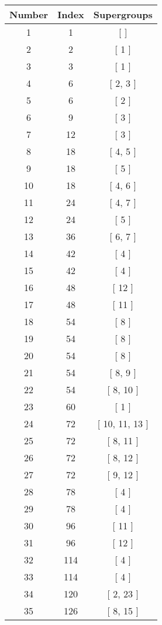\begin{center}
\begin{longtable}[H]{|| c c c ||}
\hline
Number & Index & Supergroups \\ 
\hline
1 & 1 & [  ] \\ 
\hline
2 & 2 & [ 1 ] \\ 
\hline
3 & 3 & [ 1 ] \\ 
\hline
4 & 6 & [ 2, 3 ] \\ 
\hline
5 & 6 & [ 2 ] \\ 
\hline
6 & 9 & [ 3 ] \\ 
\hline
7 & 12 & [ 3 ] \\ 
\hline
8 & 18 & [ 4, 5 ] \\ 
\hline
9 & 18 & [ 5 ] \\ 
\hline
10 & 18 & [ 4, 6 ] \\ 
\hline
11 & 24 & [ 4, 7 ] \\ 
\hline
12 & 24 & [ 5 ] \\ 
\hline
13 & 36 & [ 6, 7 ] \\ 
\hline
14 & 42 & [ 4 ] \\ 
\hline
15 & 42 & [ 4 ] \\ 
\hline
16 & 48 & [ 12 ] \\ 
\hline
17 & 48 & [ 11 ] \\ 
\hline
18 & 54 & [ 8 ] \\ 
\hline
19 & 54 & [ 8 ] \\ 
\hline
20 & 54 & [ 8 ] \\ 
\hline
21 & 54 & [ 8, 9 ] \\ 
\hline
22 & 54 & [ 8, 10 ] \\ 
\hline
23 & 60 & [ 1 ] \\ 
\hline
24 & 72 & [ 10, 11, 13 ] \\ 
\hline
25 & 72 & [ 8, 11 ] \\ 
\hline
26 & 72 & [ 8, 12 ] \\ 
\hline
27 & 72 & [ 9, 12 ] \\ 
\hline
28 & 78 & [ 4 ] \\ 
\hline
29 & 78 & [ 4 ] \\ 
\hline
30 & 96 & [ 11 ] \\ 
\hline
31 & 96 & [ 12 ] \\ 
\hline
32 & 114 & [ 4 ] \\ 
\hline
33 & 114 & [ 4 ] \\ 
\hline
34 & 120 & [ 2, 23 ] \\ 
\hline
35 & 126 & [ 8, 15 ] \\ 
\hline

\end{longtable}
\end{center}
